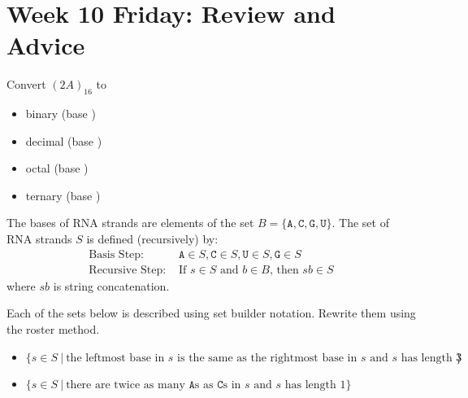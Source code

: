 \documentclass[12pt, oneside]{article}
\newcommand{\A}[0]{\texttt{A}}
\newcommand{\C}[0]{\texttt{C}}
\newcommand{\G}[0]{\texttt{G}}
\newcommand{\U}[0]{\texttt{U}}
\begin{document}
%
 

\newpage
\section*{Week 10 Friday: Review and Advice}


Convert $(2A)_{16}$ to 
\begin{itemize}
\item binary (base \underline{\phantom{~~~2~~}})

\vspace{50pt}

\item decimal (base \underline{\phantom{~~10~~}})

\vspace{50pt}

\item octal (base \underline{\phantom{~~~8~~}})

\vspace{50pt}

\item ternary (base \underline{\phantom{~~~3~~}})

\vspace{50pt}

\end{itemize} \newpage


The bases of RNA strands are elements of the set $B = \{\A, \C, \G, \U \}$. 
The set of RNA strands $S$ is defined (recursively) by:
\[
\begin{array}{ll}
\textrm{Basis Step: } & \A \in S, \C \in S, \U \in S, \G \in S \\
\textrm{Recursive Step: } & \textrm{If } s \in S\textrm{ and }b \in B \textrm{, then }sb \in S
\end{array}
\]
where $sb$ is string concatenation.

Each of the sets below is described using set builder notation. Rewrite them using the roster method. 
\begin{itemize}
\item $\{s \in S ~|~ \text{the leftmost base in $s$ is the same as the rightmost base in $s$ and 
$s$ has length $3$} \}$ 

\vspace{50pt}

\item $\{s \in S ~|~ \text{there are twice as many $\A$s as $\C$s in $s$ and $s$ has length $1$} \}$ 

\vspace{50pt}

\end{itemize}
\end{document}
